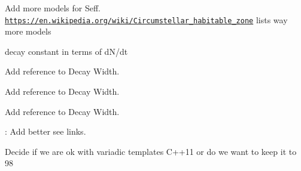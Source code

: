 
\begin{DoxyRefList}
\item[\label{todo__todo000001}%
\Hypertarget{todo__todo000001}%
Module \hyperlink{group___e_g_x_phys-_circumstellar_habitable_zone}{E\+G\+X\+Phys-\/\+Circumstellar\+Habitable\+Zone} ]Add more models for Seff. \href{https://en.wikipedia.org/wiki/Circumstellar_habitable_zone}{\tt https\+://en.\+wikipedia.\+org/wiki/\+Circumstellar\+\_\+habitable\+\_\+zone} lists way more models  
\item[\label{todo__todo000002}%
\Hypertarget{todo__todo000002}%
Module \hyperlink{group___e_g_x_phys-_decay_constant}{E\+G\+X\+Phys-\/\+Decay\+Constant} ]decay constant in terms of d\+N/dt  
\item[\label{todo__todo000003}%
\Hypertarget{todo__todo000003}%
Module \hyperlink{group___e_g_x_phys-_half_life}{E\+G\+X\+Phys-\/\+Half\+Life} ]Add reference to Decay Width.  
\item[\label{todo__todo000004}%
\Hypertarget{todo__todo000004}%
Module \hyperlink{group___e_g_x_phys-_nuclear_binding_energy}{E\+G\+X\+Phys-\/\+Nuclear\+Binding\+Energy} ]Add reference to Decay Width.  
\item[\label{todo__todo000007}%
\Hypertarget{todo__todo000007}%
Module \hyperlink{group___e_g_x_phys-_semi_empirical_mass_formula}{E\+G\+X\+Phys-\/\+Semi\+Empirical\+Mass\+Formula} ]Add reference to Decay Width.  
\item[\label{todo__todo000005}%
\Hypertarget{todo__todo000005}%
File \hyperlink{_nuclear_separation_energy_8hpp}{Nuclear\+Separation\+Energy.hpp} ]\+: Add better see links.  
\item[\label{todo__todo000006}%
\Hypertarget{todo__todo000006}%
File \hyperlink{_q_value_8hpp}{Q\+Value.hpp} ]Decide if we are ok with variadic templates C++11 or do we want to keep it to 98 
\end{DoxyRefList}